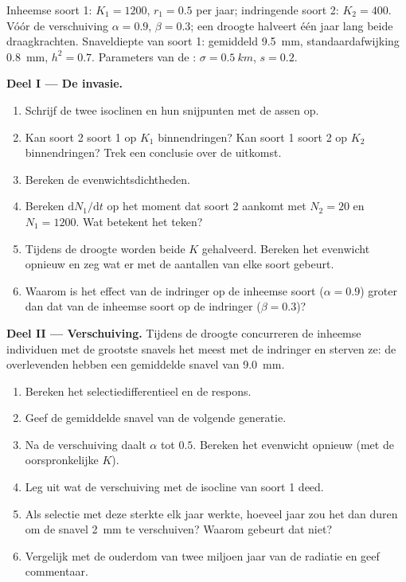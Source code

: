 \begin{problem}
\label{pb:b2:speciation:1}
Inheemse soort 1: $K_1 = 1200$, $r_1 = 0.5$ per jaar; indringende
soort 2: $K_2 = 400$. Vóór de verschuiving $\alpha = 0.9$, $\beta =
0.3$; een droogte halveert één jaar lang beide draagkrachten. Snaveldiepte
van soort 1: gemiddeld \qty{9.5}{mm}, standaardafwijking
\qty{0.8}{mm}, $h^{2} = 0.7$. Parameters van de : $\sigma =
\qty{0.5}{km}$, $s = 0.2$.

\medskip
\noindent\textbf{Deel I --- De invasie.}
\begin{enumerate}
  \item Schrijf de twee isoclinen en hun snijpunten met de assen op.
  \item Kan soort 2 soort 1 op $K_1$ binnendringen? Kan soort 1
        soort 2 op $K_2$ binnendringen? Trek een conclusie over de uitkomst.
  \item Bereken de evenwichtsdichtheden.
  \item Bereken $\mathrm{d}N_1/\mathrm{d}t$ op het moment dat soort 2
        aankomt met $N_2 = 20$ en $N_1 = 1200$. Wat betekent het
        teken?
  \item Tijdens de droogte worden beide $K$ gehalveerd. Bereken het
        evenwicht opnieuw en zeg wat er met de aantallen van elke soort gebeurt.
  \item Waarom is het effect van de indringer op de inheemse soort ($\alpha = 0.9$)
        groter dan dat van de inheemse soort op de indringer ($\beta = 0.3$)?
\end{enumerate}

\medskip
\noindent\textbf{Deel II --- Verschuiving.}
Tijdens de droogte concurreren de inheemse individuen met de grootste snavels
het meest met de indringer en sterven ze: de overlevenden hebben een
gemiddelde snavel van \qty{9.0}{mm}.
\begin{enumerate}[resume]
  \item Bereken het selectiedifferentieel en de respons.
  \item Geef de gemiddelde snavel van de volgende generatie.
  \item Na de verschuiving daalt $\alpha$ tot $0.5$. Bereken het
        evenwicht opnieuw (met de oorspronkelijke $K$).
  \item Leg uit wat de verschuiving met de isocline van soort 1 deed.
  \item Als selectie met deze sterkte elk jaar werkte, hoeveel
        jaar zou het dan duren om de snavel \qty{2}{mm} te verschuiven? Waarom
        gebeurt dat niet?
  \item Vergelijk met de ouderdom van twee miljoen jaar van de radiatie en
        geef commentaar.
\end{enumerate}


\end{problem}
